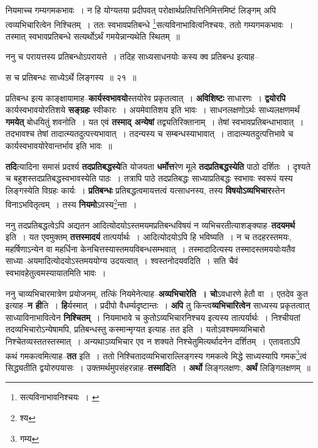 \documentclass[article,12pt,a4paper]{memoir}
\begin{document}
	  \pstart नियमाच्च गम्यगमकभावः । न हि योग्यतया प्रदीपवत् परोक्षार्थप्रतिपत्तिनिमित्तमिष्टं लिङ्गम् अपि त्वव्यभिचारित्वेन निश्चितम् । ततः स्वभावप्रतिबन्धे \footnote{सत्यविनाभावनिश्चयः । \cite{dp-msA} \cite{dp-edP} \cite{dp-edH} \cite{dp-edE} \cite{dp-edN}}\-सत्यविनाभावित्वनिश्चयः, ततो गम्यगमकभावः । तस्मात् स्वभावप्रतिबन्धे सत्यर्थोऽर्थं गमयेन्नान्यथेति स्थितम् ॥
	\pend
       

	  \pstart ननु च परायत्तस्य प्रतिबन्धोऽपरायत्ते । तदिह साध्यसाधनयोः कस्य क्व प्रतिबन्ध इत्याह--
	\pend
      
	  \endgroup
	
	  \bigskip
	  \begingroup
	

	  \pstart स च प्रतिबन्धः साध्येऽर्थे लिङ्गस्य ॥ २१ ॥
	\pend
      
	  \endgroup
	

	  \pstart प्रतिबन्ध इत्य काङ्क्षायामाह--\textbf{कार्यस्वभावयो}स्तयोरेव प्रकृतत्वात् । \textbf{अविशिष्टः} साधारणः । \textbf{द्वयोरपि} कार्यस्वभावयोरतिशये \textbf{सङ्ग्रहः} स्वीकारः । अयमेवातिशय इति भावः । साधनलक्षणोऽर्थः साध्यलक्षणमर्थं \textbf{गमयेत्} बोधयितुं शवनोति । यत एवं \textbf{तस्माद् अन्येषां} तद्व्यतिरिक्तानाम् । तेषां स्वभावप्रतिबन्धाभावात् । तदभावश्च तेषां तादात्म्यतदुत्पत्त्यभावात् । तदन्यस्य च सम्बन्धस्याभावात् । तादात्म्यतदुत्पत्तिभावे च कार्यस्वभावयोरेवान्तर्भाव इति भावः ॥
	\pend
      

	  \pstart \textbf{तदि}त्यादिना समासं प्रदर्श्य \textbf{तदप्रतिबद्धस्ये}ति योजयता \textbf{धर्मोत्त}रेण मूले \textbf{तदप्रतिबद्धस्येति} पाठो दर्शितः । दृश्यते च बहुशस्तदप्रतिबद्धस्वभावस्येति पाठः । तत्रापि पाठे तदप्रतिबद्धः साध्याप्रतिबद्धः स्वभावः स्वरूपं यस्य लिङ्गस्येति विग्रहः कार्यः । \textbf{प्रतिबन्धः} प्रतिबद्धत्वमायत्तत्वं यत्साधनस्य, तस्य \textbf{विषयोऽव्यभिचार}स्तेन विनाऽभवितृत्वम् । तस्य \textbf{नियमो}ऽवस्य\footnote{श्य}\-न्ता ।
	\pend
      

	  \pstart ननु तदप्रतिबद्धत्वेऽपि अद्यतन आदित्योदयोऽस्तमयमप्रतिबन्धविषयं न व्यभिचरतीत्याशङ्क्याह--\textbf{तदयमर्थ} इति । यत एवमुक्तम् \textbf{तत्तस्मादयं} तात्पर्यार्थः । आदित्योदयोऽपि हि भविष्यति । न च तदहरस्तमयः, महर्षिणाऽन्येन वा महर्धिना केनचित्तस्यास्तमयविबन्धसम्भवात् । तस्मादादित्यस्य तस्मादस्तमययोःयतैव साध्या--अयमादित्योदयोऽस्तमययोग्य उदयत्वात् । श्वस्तनोदयवदिति । सति चैवं स्वभावहेतुत्वमस्यायातमिति भावः ।
	\pend
      

	  \pstart ननु चाव्यभिचारमात्रेण प्रयोजनम्, तत्किं नियमेनेत्याह--\textbf{अव्यभिचारेति । चो}ऽवधारणे हेतौ वा । एतदेव कुत इत्याह--\textbf{न ही}ति । \leavevmode{} \textbf{हि}र्यस्मात् । प्रदीपो वैधर्म्यदृष्टान्तः । \textbf{अपि} तु किन्त्व\textbf{व्यभिचारित्वेन} साध्यस्य प्रकृतत्वात् साध्याविनाभावित्वेन \textbf{निश्चितम्} । नियमाभावे च कुतोऽव्यभिचारनिश्चय इत्यस्य तात्पर्यार्थः । निश्चीयतां तदव्यभिचारोऽन्येषामपि, प्रतिबन्धस्तु कस्मान्मृग्यत इत्याह--तत इति । यतोऽवश्यमव्यभिचारो निश्चेतव्यस्ततस्तस्मात् । अन्यथाऽव्यभिचार एव न शक्यते निश्चेतुमित्यर्थादनेन दर्शितम् । एतावताऽपि कथं गमकत्वमित्याह--\textbf{तत} इति । ततो निश्चितादव्यभिचाराल्लिङ्गस्य गमकत्वे मिद्धे साध्यस्यापि गमक\footnote{गम्य}\-त्वं सिद्ध्यतीति द्वयोरुपयासः । उक्तमर्थमुपसंहरन्नाह--\textbf{तस्मादि}ति । \textbf{अर्थो} लिङ्गलक्षणः, \textbf{अर्थं} लिङ्गिलक्षणम् ॥
	\pend
      
\end{document}
